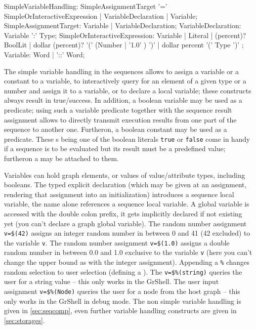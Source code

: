 \begin{rail}
  SimpleVariableHandling: SimpleAssignmentTarget '=' SimpleOrInteractiveExpression | VariableDeclaration | Variable;
  SimpleAssignmentTarget: Variable | VariableDeclaration; 
	VariableDeclaration: Variable ':' Type;
	SimpleOrInteractiveExpression:
		Variable |  
		Literal | 
    (percent)? BoolLit |
		dollar (percent)? '(' (Number | '1.0' ) ')' |
		dollar percent '(' Type ')'
  ;
  Variable: Word | '::' Word;
\end{rail}\makeatother

The simple variable handling in the sequences allows to assign a variable or a constant to a variable, to interactively query for an element of a given type or a number and assign it to a variable, or to declare a local variable; these constructs always result in true/success.
In addition, a boolean variable may be used as a predicate; using such a variable predicate together with the sequence result assignment allows to directly transmit execution results from one part of the sequence to another one.
Furtheron, a boolean constant may be used as a predicate. 
These s being one of the boolean literals \texttt{true} or \texttt{false} come in handy if a sequence is to be evaluated but its result must be a predefined value; furtheron a  may be attached to them.

Variables can hold graph elements, or values of value/attribute types, including booleans.
The typed explicit declaration (which may be given at an assignment, rendering that assignment into an initialization) introduces a sequence local variable, the name alone references a sequence local variable.
A global variable is accessed with the double colon prefix, it gets implicitly declared if not existing yet (you can't declare a graph global variable).
The random number assignment \texttt{v=\$(42)} assigns an integer random number in between 0 and 41 (42 excluded) to the variable \texttt{v}. 
The random number assignment \texttt{v=\$(1.0)} assigns a double random number in between 0.0 and 1.0 exclusive to the variable \texttt{v} (here you can't change the upper bound as with the integer assignment). 
Appending a \texttt{\%} changes random selection to user selection (defining a ).
The  \texttt{v=\$\%(string)} queries the user for a string value -- this only works in the GrShell.
The user input assignment \texttt{v=\$\%(Node)} queries the user for a node from the host graph -- this only works in the GrShell in debug mode.
The non simple variable handling is given in \ref{sec:seqcomp}, even further variable handling constructs are given in \ref{sec:storages}.

